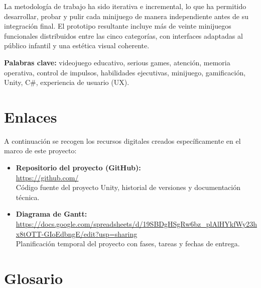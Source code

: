 \documentclass[12pt, a4paper]{report}
\begin{document}
La metodología de trabajo ha sido iterativa e incremental, lo que ha permitido
desarrollar, probar y pulir cada minijuego de manera independiente antes de su
integración final. El prototipo resultante incluye más de veinte minijuegos
funcionales distribuidos entre las cinco categorías, con interfaces adaptadas
al público infantil y una estética visual coherente.

\bigskip
\textbf{Palabras clave:} videojuego educativo, serious games, atención, memoria operativa,
control de impulsos, habilidades ejecutivas, minijuego, gamificación, Unity, C\#,
experiencia de usuario (UX).

\chapter*{Enlaces}

A continuación se recogen los recursos digitales creados específicamente en el
marco de este proyecto:

\begin{itemize}
  \item \textbf{Repositorio del proyecto (GitHub):}\\
    \url{https://github.com/} \\
    Código fuente del proyecto Unity, historial de versiones y documentación
    técnica.

  \item \textbf{Diagrama de Gantt:}\\
    \url{https://docs.google.com/spreadsheets/d/19SBDgHSgRw6bz_plAlHYkfWy23hx8tOTT-GIoEdbngE/edit?usp=sharing}\\
    Planificación temporal del proyecto con fases, tareas y fechas de entrega.
\end{itemize}

\listoftables
{}

\listoffigures
{}

\chapter*{Glosario}
\end{document}
